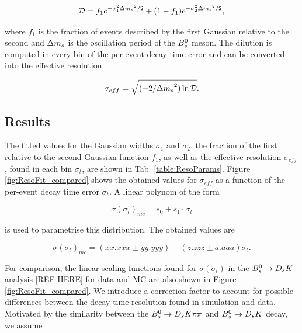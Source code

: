 \begin{equation}
\mathcal{D} = f_{1}e^{-\sigma_{1}^{2}{\Delta m_{{s}}}^{2}/2} + (1 - f_{1}) e^{-\sigma_{2}^{2}{\Delta m_{{s}}}^{2}/2},
\label{eq:t-dilution}
\end{equation}   

where $f_{1}$ is the fraction of events described by the first Gaussian relative to the second and ${\Delta m_{{s}}}$ is the oscillation period of the ${{B}^0_{s}}$ meson. \newline   
The dilution is computed in every bin of the per-event decay time error and can be converted into the effective resolution

\begin{equation}
\sigma_{eff} = \sqrt{(-2/{\Delta m_{{s}}}^{2})\ln{\mathcal{D}}}.
\label{eq:effres}
\end{equation}




\subsection{Results}

The fitted values for the Gaussian widths $\sigma_{1}$ and $\sigma_{2}$, 
the fraction of the first relative to the second Gaussian function $f_{1}$, as well as the effective resolution $\sigma_{eff}$, found in each bin $\sigma_{t}$, are shown in Tab. \ref{table:ResoParams}.
Figure \ref{fig:ResoFit_compared} shows the obtained values for $\sigma_{eff}$ as a function of the per-event decay time error $\sigma_{t}$. A linear polynom of the form  

\begin{equation}
\sigma(\sigma_{t})_{mc} = s_{0} + s_{1}\cdot \sigma_{t} 
\label{eq:resfit}
\end{equation}

is used to parametrise this distribution. The obtained values are 

\begin{equation}
\sigma(\sigma_{t})_{mc} = (xx.xxx\pm yy.yyy) + (z.zzz \pm a.aaa) \sigma_{t}. 
\label{eq:resfitres}
\end{equation}

For comparison, the linear scaling functions found for $\sigma(\sigma_{t})$ in the ${{B}^0_{s}}\rightarrow{\ensuremath{{D}_{s}}}{\ensuremath{K}}$ analysis [REF HERE] for data and MC are also shown in Figure \ref{fig:ResoFit_compared}.  
We introduce a correction factor to account for possible differences between the decay time resolution found in simulation and data. 
Motivated by the similarity between the ${{B}^0_{s}}\rightarrow{\ensuremath{{D}_{s}}}{\ensuremath{K}}{\ensuremath{\pi}}{\ensuremath{\pi}}$ and ${{B}^0_{s}}\rightarrow{\ensuremath{{D}_{s}}}{\ensuremath{K}}$ decay, we assume

